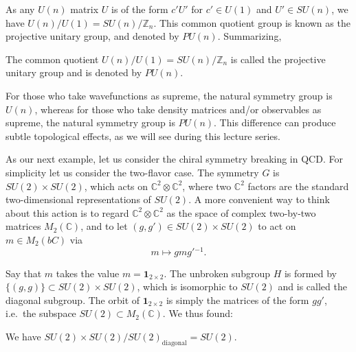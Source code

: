 \documentclass[12pt]{article}
\numberwithin{equation}{section}
\def\bC{\mathbb{C}}
\def\bZ{\mathbb{Z}}
\begin{document}
As any $U(n)$ matrix $U$ is of the form $c'U'$ for $c'\in U(1)$ and $U'\in SU(n)$,
we have $U(n)/U(1) = SU(n)/\bZ_n$.
This common quotient group is known as the projective unitary group, and denoted by $PU(n)$.
Summarizing, 
\begin{example}
The common quotient $U(n)/U(1)=SU(n)/\bZ_n$ is called the projective unitary group and is denoted by $PU(n)$.
\end{example}

For those who take wavefunctions as supreme, the natural symmetry group is $U(n)$,
whereas for those who take density matrices and/or observables as supreme,
the natural symmetry group is $PU(n)$.
This difference can produce subtle topological effects,
as we will see during this lecture series.

As our next example, 
let us consider the chiral symmetry breaking in QCD.
For simplicity let us consider the two-flavor case.
The symmetry $G$ is $SU(2)\times SU(2)$,
which acts on $\bC^2 \otimes \bC^2$,
where two $\bC^2$ factors are the standard two-dimensional representations of $SU(2)$.
A more convenient way to think about this action
is to regard $\bC^2\otimes \bC^2$ as the space of 
complex two-by-two matrices $M_2(\bC)$,
and to let $(g,g')\in SU(2)\times SU(2)$ to act on $m\in M_2(bC)$
via \begin{equation}
m\mapsto g m g'{}^{-1}.
\end{equation}

Say that $m$ takes the value $m=\mathbf{1}_{2\times 2}$.
The unbroken subgroup $H$ is formed by 
$\{(g,g)\}\subset SU(2)\times SU(2)$,
which is isomorphic to $SU(2)$ and is called the diagonal subgroup.
The orbit of $\mathbf{1}_{2\times 2}$ is simply 
the matrices of the form $gg'$,
i.e.~the subspace $SU(2)\subset M_2(\bC)$.
We thus found:
\begin{proposition}
We have $SU(2)\times SU(2)/SU(2)_\text{diagonal} = SU(2)$.
\end{proposition}
\end{document}
